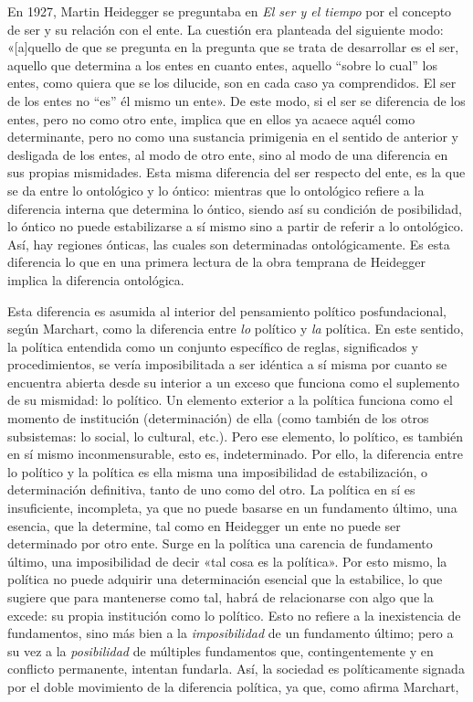 En 1927, Martin Heidegger se preguntaba en \emph{El ser y el tiempo} por el concepto de ser y su relación con el ente. La cuestión era planteada del siguiente modo: «{[}a{]}quello de que se pregunta en la pregunta que se trata de desarrollar es el ser, aquello que determina a los entes en cuanto entes, aquello ``sobre lo cual'' los entes, como quiera que se los dilucide, son en cada caso ya comprendidos. El ser de los entes no ``es'' él mismo un ente». De este modo, si el ser se diferencia de los entes, pero no como otro ente, implica que en ellos ya acaece aquél como determinante, pero no como una sustancia primigenia en el sentido de anterior y desligada de los entes, al modo de otro ente, sino al modo de una diferencia en sus propias mismidades. Esta misma diferencia del ser respecto del ente, es la que se da entre lo ontológico y lo óntico: mientras que lo ontológico refiere a la diferencia interna que determina lo óntico, siendo así su condición de posibilidad, lo óntico no puede estabilizarse a sí mismo sino a partir de referir a lo ontológico. Así, hay regiones ónticas, las cuales son determinadas ontológicamente. Es esta diferencia lo que en una primera lectura de la obra temprana de Heidegger implica la diferencia ontológica.

Esta diferencia es asumida al interior del pensamiento político posfundacional, según Marchart, como la diferencia entre \emph{lo} político y \emph{la} política. En este sentido, la política entendida como un conjunto específico de reglas, significados y procedimientos, se vería imposibilitada a ser idéntica a sí misma por cuanto se encuentra abierta desde su interior a un exceso que funciona como el suplemento de su mismidad: lo político. Un elemento exterior a la política funciona como el momento de institución (determinación) de ella (como también de los otros subsistemas: lo social, lo cultural, etc.). Pero ese elemento, lo político, es también en sí mismo inconmensurable, esto es, indeterminado. Por ello, la diferencia entre lo político y la política es ella misma una imposibilidad de estabilización, o determinación definitiva, tanto de uno como del otro. La política en sí es insuficiente, incompleta, ya que no puede basarse en un fundamento último, una esencia, que la determine, tal como en Heidegger un ente no puede ser determinado por otro ente. Surge en la política una carencia de fundamento último, una imposibilidad de decir «tal cosa es la política». Por esto mismo, la política no puede adquirir una determinación esencial que la estabilice, lo que sugiere que para mantenerse como tal, habrá de relacionarse con algo que la excede: su propia institución como lo político. Esto no refiere a la inexistencia de fundamentos, sino más bien a la \emph{imposibilidad} de un fundamento último; pero a su vez a la \emph{posibilidad} de múltiples fundamentos que, contingentemente y en conflicto permanente, intentan fundarla. Así, la sociedad es políticamente signada por el doble movimiento de la diferencia política, ya que, como afirma Marchart,

